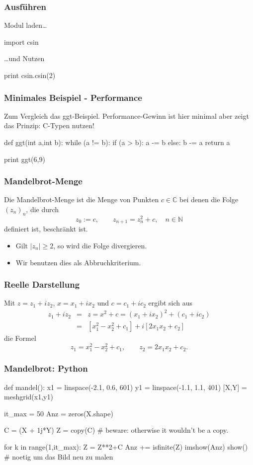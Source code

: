 \documentclass[hyperref={xetex}]{beamer}
\begin{document}
\begin{frame}[fragile]\frametitle{Ausführen}
Modul laden\ldots
  \begin{pyin}
    import csin
  \end{pyin}
\ldots und Nutzen
  \begin{pyin}
    print csin.csin(2)
  \end{pyin}
\end{frame}

\begin{frame}[fragile]\frametitle{Minimales Beispiel - Performance}
Zum Vergleich das ggt-Beispiel. Performance-Gewinn ist hier minimal aber zeigt das Prinzip: C-Typen nutzen!
  \begin{pyin}
def ggt(int a,int b):
    while (a != b):
        if (a > b):
            a -= b
        else:
            b -= a
    return a

print ggt(6,9)    
  \end{pyin}
\end{frame}

\begin{frame}[fragile]\frametitle{Mandelbrot-Menge}
Die Mandelbrot-Menge ist die Menge von Punkten $c \in \mathbb{C}$
bei denen die Folge $(z_n)_n$, die durch
\[ z_0:=c, \qquad  z_{n+1} = z_n^2 +c, \quad n \in \mathbb{N}\]
definiert ist, beschr\"ankt ist.
\begin{itemize}
\item Gilt $|z_n| \geq 2$, so wird die Folge divergieren.
\item Wir benutzen dies als Abbruchkriterium.
\end{itemize}
\end{frame}
\begin{frame}[fragile]\frametitle{Reelle Darstellung}
Mit $z=z_1+iz_2$, $x=x_1+ix_2$ und $c=c_1+ic_2$ ergibt sich aus
\begin{eqnarray*}
z_1 + i z_2 & = & z  =  x^2 + c = (x_1+ix_2)^2 + (c_1+ic_2) \\
& = & [ x_1^2 -x_2^2 +c_1] + i[2 x_1 x_2 +c_2]
\end{eqnarray*}
die Formel
\[ z_1 = x_1^2 -x_2^2 +c_1, \qquad z_2 = 2 x_1 x_2 + c_2. \]
\end{frame}

\begin{frame}[fragile]\frametitle{Mandelbrot: Python}
  \begin{pyin}
def mandel():
    x1 = linspace(-2.1, 0.6, 601)
    y1 = linspace(-1.1, 1.1, 401)
    [X,Y] = meshgrid(x1,y1)

    it_max = 50
    Anz = zeros(X.shape)

    C = (X + 1j*Y)
    Z = copy(C) # beware: otherwise it wouldn't be a copy.

    for k in range(1,it_max):
        Z = Z**2+C
        Anz += isfinite(Z)
    imshow(Anz)
    show() # noetig um das Bild neu zu malen    
  \end{pyin}
\end{frame}
\end{document}
